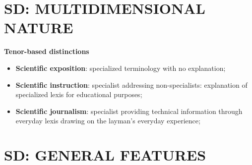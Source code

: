 \section{SD: MULTIDIMENSIONAL NATURE}

\textbf{Tenor-based distinctions}

\begin{itemize}

\item\textbf{Scientific exposition}:
specialized terminology with no explanation;

\item\textbf{Scientific instruction}:
specialist addressing non-specialists: explanation of specialized lexis for educational purposes;

\item\textbf{Scientific journalism}:
specialist providing technical information through everyday lexis drawing on the layman’s everyday experience;
 
\end{itemize}

\section{SD: GENERAL FEATURES}

